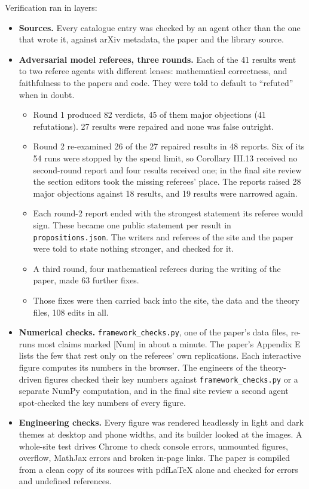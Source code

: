 Verification ran in layers:

\begin{itemize}
\item \textbf{Sources.} Every catalogue entry was checked by an agent other than the one that wrote it, against arXiv metadata, the paper and the library source.
\item \textbf{Adversarial model referees, three rounds.} Each of the 41 results went to two referee agents with different lenses: mathematical correctness, and faithfulness to the papers and code. They were told to default to ``refuted'' when in doubt.
\begin{itemize}
\item Round 1 produced 82 verdicts, 45 of them major objections (41 refutations). 27 results were repaired and none was false outright.
\item Round 2 re-examined 26 of the 27 repaired results in 48 reports. Six of its 54 runs were stopped by the spend limit, so Corollary III.13 received no second-round report and four results received one; in the final site review the section editors took the missing referees' place. The reports raised 28 major objections against 18 results, and 19 results were narrowed again.
\item Each round-2 report ended with the strongest statement its referee would sign. These became one public statement per result in \texttt{propositions.json}. The writers and referees of the site and the paper were told to state nothing stronger, and checked for it.
\item A third round, four mathematical referees during the writing of the paper, made 63 further fixes.
\item Those fixes were then carried back into the site, the data and the theory files, 108 edits in all.
\end{itemize}
\item \textbf{Numerical checks.} \texttt{framework\_checks.py}, one of the paper's data files, re-runs most claims marked [Num] in about a minute. The paper's Appendix E lists the few that rest only on the referees' own replications. Each interactive figure computes its numbers in the browser. The engineers of the theory-driven figures checked their key numbers against \texttt{framework\_checks.py} or a separate NumPy computation, and in the final site review a second agent spot-checked the key numbers of every figure.
\item \textbf{Engineering checks.} Every figure was rendered headlessly in light and dark themes at desktop and phone widths, and its builder looked at the images. A whole-site test drives Chrome to check console errors, unmounted figures, overflow, MathJax errors and broken in-page links. The paper is compiled from a clean copy of its sources with pdfLaTeX alone and checked for errors and undefined references.

\end{itemize}
